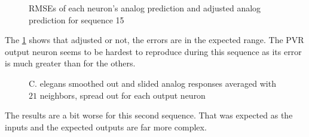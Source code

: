 \begin{figure}[H]
  \centering
  
  \caption{\acp{RMSE} of each neuron's analog prediction and adjusted analog prediction for sequence 15}
  \label{bar:rmse15}
\end{figure}

The \cref{bar:rmse15} shows that adjusted or not, the errors are in the expected range. The PVR output neuron seems to be hardest to reproduce during this sequence as its error is much greater than for the others.

\begin{figure}[H]
  \centering
  \begin{minipage}{\columnwidth}
    \hfill
  \end{minipage}
  \begin{minipage}{\columnwidth}
    \hfill
  \end{minipage}
  \caption{\ac{C. elegans} smoothed out and slided analog responses averaged with $21$ neighbors, spread out for each output neuron}
  \label{graph:smooth15Celegans}
\end{figure}

The results are a bit worse for this second sequence. That was expected as the inputs and the expected outputs are far more complex.
